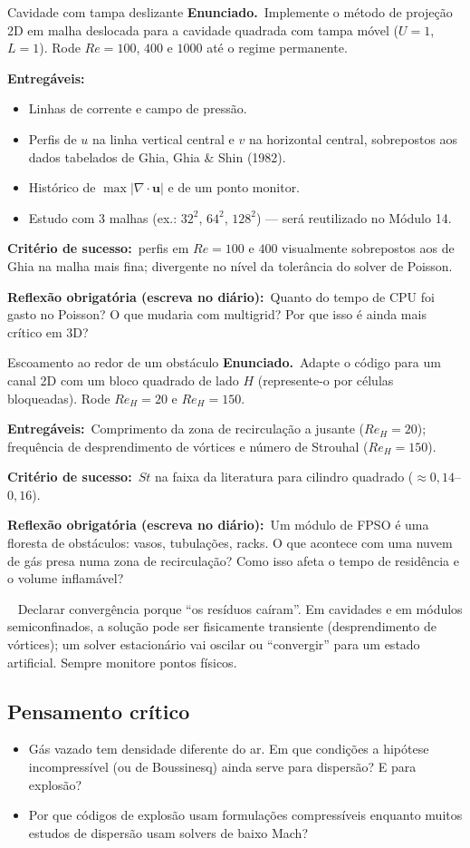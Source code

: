 \documentclass[10pt,a4paper,twocolumn,openany]{report}
\newcommand{\lead}[2]{\par\medskip\noindent{\color{#1}\bfseries #2}\ }
\newenvironment{armadilha}{\lead{vermelho}{Armadilha clássica.}}{\par\medskip}
\newenvironment{critico}{\subsection*{\textcolor{roxo}{Pensamento crítico}}}{\par}
\newcommand{\enunciado}{\noindent\textbf{Enunciado.}\ }
\newcommand{\entregaveis}{\par\medskip\noindent\textbf{Entregáveis:}}
\newcommand{\criterio}{\par\medskip\noindent\textbf{Critério de sucesso:}\ }
\newcommand{\reflexao}{\par\medskip\noindent\textbf{Reflexão obrigatória (escreva no diário):}}
\begin{document}
\begin{tarefa}{Cavidade com tampa deslizante}
\enunciado Implemente o método de projeção 2D em malha deslocada para a
cavidade quadrada com tampa móvel ($U=1$, $L=1$). Rode $Re=100$, $400$ e
$1000$ até o regime permanente.
\entregaveis
\begin{itemize}
  \item Linhas de corrente e campo de pressão.
  \item Perfis de $u$ na linha vertical central e $v$ na horizontal central,
        sobrepostos aos dados tabelados de Ghia, Ghia \& Shin (1982).
  \item Histórico de $\max|\nabla\cdot\mathbf{u}|$ e de um ponto monitor.
  \item Estudo com 3 malhas (ex.: $32^2$, $64^2$, $128^2$) --- será reutilizado
        no Módulo 14.
\end{itemize}
\criterio perfis em $Re=100$ e $400$ visualmente sobrepostos aos de Ghia na
malha mais fina; divergente no nível da tolerância do solver de Poisson.
\reflexao\ Quanto do tempo de CPU foi gasto no Poisson? O que mudaria com
multigrid? Por que isso é ainda mais crítico em 3D?
\end{tarefa}

\begin{tarefa}{Escoamento ao redor de um obstáculo}
\enunciado Adapte o código para um canal 2D com um bloco quadrado de lado $H$
(represente-o por células bloqueadas). Rode $Re_H=20$ e $Re_H=150$.
\entregaveis\ Comprimento da zona de recirculação a jusante ($Re_H=20$);
frequência de desprendimento de vórtices e número de Strouhal ($Re_H=150$).
\criterio $St$ na faixa da literatura para cilindro quadrado ($\approx0{,}14$--$0{,}16$).
\reflexao\ Um módulo de FPSO é uma floresta de obstáculos: vasos, tubulações,
racks. O que acontece com uma nuvem de gás presa numa zona de recirculação?
Como isso afeta o tempo de residência e o volume inflamável?
\end{tarefa}

\begin{armadilha}
Declarar convergência porque ``os resíduos caíram''. Em cavidades e em
módulos semiconfinados, a solução pode ser fisicamente transiente
(desprendimento de vórtices); um solver estacionário vai oscilar ou
``convergir'' para um estado artificial. Sempre monitore pontos físicos.
\end{armadilha}

\begin{critico}
\begin{itemize}
  \item Gás vazado tem densidade diferente do ar. Em que condições a hipótese
        incompressível (ou de Boussinesq) ainda serve para dispersão? E para
        explosão?
  \item Por que códigos de explosão usam formulações compressíveis enquanto
        muitos estudos de dispersão usam solvers de baixo Mach?
\end{itemize}
\end{critico}
\end{document}
